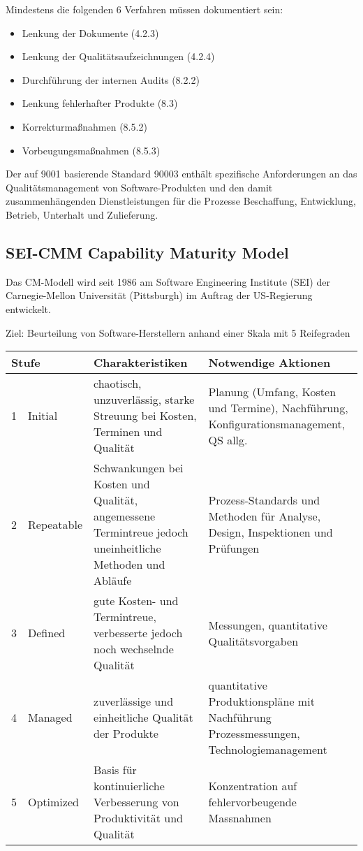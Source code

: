 \ifslides
\newpage
\fi
Mindestens die folgenden 6 Verfahren müssen dokumentiert sein:
\begin{itemize}
\item Lenkung der Dokumente (4.2.3)
\item Lenkung der Qualitätsaufzeichnungen (4.2.4)
\item Durchführung der internen Audits (8.2.2)
\item Lenkung fehlerhafter Produkte (8.3)
\item Korrekturmaßnahmen (8.5.2)
\item Vorbeugungsmaßnahmen (8.5.3)
\end{itemize}

Der auf 9001 basierende Standard 90003 enthält spezifische Anforderungen an das
Qua\-li\-täts\-manage\-ment von Software-Produkten und den damit zusammenhängenden
Dienst\-lei\-stungen für die Prozesse Beschaffung, Entwicklung, Betrieb, Unterhalt
und Zulieferung.

%
\subsection{SEI-CMM Capability Maturity Model}
Das CM-Modell wird seit 1986 am Software Engineering Institute (SEI)
der Carnegie-Mellon Universität (Pittsburgh) im Auftrag der US-Regierung
entwickelt.

Ziel: Beurteilung von Software-Herstellern anhand einer Skala
 mit 5 Reifegraden\\[2ex]
\ifslides
{\small
\fi
\begin{tabular}{|ll|p{4.5cm}|p{4.5cm}|}
\hline
\multicolumn{2}{|l|}{Stufe}  & Charakteristiken & Notwendige Aktionen \\
\hline
1 & Initial & chaotisch, unzuverlässig, starke Streuung bei
                  Kosten, Terminen und Qualität
                         & Planung (Umfang, Kosten und Termine), Nachführung,
                           Konfigurationsmanagement, QS allg. \\
\hline
2 & Repeatable &  Schwankungen bei Kosten und Qualität,
                  angemessene Termintreue jedoch uneinheitliche Methoden
                  und Abläufe
                         & Prozess-Standards und Methoden für Analyse,
                            Design, Inspektionen und Prüfungen\\
\hline
3 & Defined &   gute Kosten- und Termintreue, verbesserte
               jedoch noch wechselnde Qualität
                         & Messungen, quantitative Qualitätsvorgaben  \\
\hline
4 & Managed &  zuverlässige und einheitliche Qualität der Produkte
                         &  quantitative Produktionspläne mit Nachführung
                            Prozessmessungen, Technologiemanagement\\
\hline
5 & Optimized & Basis für kontinuierliche Verbesserung von
             Produktivität und Qualität
                &  Konzentration auf fehlervorbeugende Massnahmen\\
\hline
\end{tabular}
\ifslides
}
\else
\newpage
\fi
